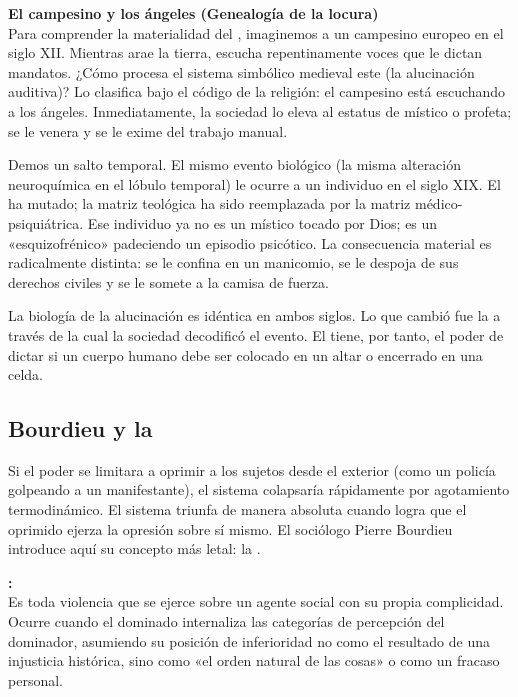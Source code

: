 \begin{ejemplo}
\textbf{El campesino y los ángeles (Genealogía de la locura)}\\
Para comprender la materialidad del \RegimenVerdad, imaginemos a un campesino europeo en el siglo XII. Mientras arae la tierra, escucha repentinamente voces que le dictan mandatos. ¿Cómo procesa el sistema simbólico medieval este \HechoBruto{} (la alucinación auditiva)? Lo clasifica bajo el código de la religión: el campesino está escuchando a los ángeles. Inmediatamente, la sociedad lo eleva al estatus de místico o profeta; se le venera y se le exime del trabajo manual.

Demos un salto temporal. El mismo evento biológico (la misma alteración neuroquímica en el lóbulo temporal) le ocurre a un individuo en el siglo XIX. El \RegimenVerdad{} ha mutado; la matriz teológica ha sido reemplazada por la matriz médico-psiquiátrica. Ese individuo ya no es un místico tocado por Dios; es un «esquizofrénico» padeciendo un episodio psicótico. La consecuencia material es radicalmente distinta: se le confina en un manicomio, se le despoja de sus derechos civiles y se le somete a la camisa de fuerza. 

La biología de la alucinación es idéntica en ambos siglos. Lo que cambió fue la \FormaSimbolica{} a través de la cual la sociedad decodificó el evento. El \RegimenVerdad{} tiene, por tanto, el poder de dictar si un cuerpo humano debe ser colocado en un altar o encerrado en una celda.
\end{ejemplo}

\subsection{Bourdieu y la \ViolenciaSimbolica}

Si el poder se limitara a oprimir a los sujetos desde el exterior (como un policía golpeando a un manifestante), el sistema colapsaría rápidamente por agotamiento termodinámico. El sistema triunfa de manera absoluta cuando logra que el oprimido ejerza la opresión sobre sí mismo. El sociólogo Pierre Bourdieu introduce aquí su concepto más letal: la \textbf{\ViolenciaSimbolica}.

\begin{definicion}
\textbf{\ViolenciaSimbolica:}\\
Es toda violencia que se ejerce sobre un agente social con su propia complicidad. Ocurre cuando el dominado internaliza las categorías de percepción del dominador, asumiendo su posición de inferioridad no como el resultado de una injusticia histórica, sino como «el orden natural de las cosas» o como un fracaso personal.
\end{definicion}

